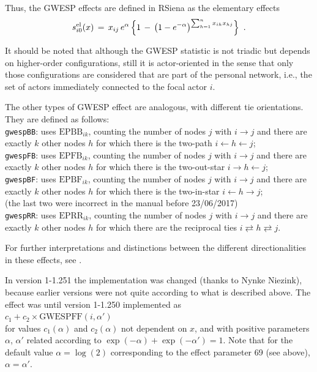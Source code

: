 \documentclass[a4paper,fleqn,11pt]{article}
\newcommand{\+}{\, + \,}
\newcommand{\RS}{{\sf \textsf{RSiena} }}
\newcommand{\vit}{\theenumi}
\begin{document}
\begin{enumerate}
Thus, the GWESP effects are defined in \RS as the elementary effects
\begin{equation}
 s^{\rm el}_{i\vit}(x) \,=\,
       x_{ij} \,
                        e^{\alpha} \,\Big\{1 \,-\, \big(1 -
                        e^{-\alpha}\big)^{\sum_{h=1}^n x_{ih}x_{hj} }  \Big\}
      \,   \ .
         \label{GWESP3}
\end{equation}

It should be noted that although the GWESP statistic is not triadic but
depends on higher-order configurations, still it is actor-oriented
in the sense that only those configurations are considered that are part of the
personal network, i.e., the set of actors immediately connected
to the focal actor $i$.

The other types of GWESP effect are analogous, with
different tie orientations. They are defined as follows:\\
\texttt{gwespBB}: uses $\text{EPBB}_{ik}$, counting the number of nodes $j$
with $i \rightarrow j$ and there are exactly $k$ other
nodes $h$ for which there is the two-path $i \leftarrow h \leftarrow j$;\\
\texttt{gwespFB}: uses $\text{EPFB}_{ik}$, counting the number of nodes $j$
with $i \rightarrow j$ and there are exactly $k$ other
nodes $h$ for which there is the two-out-star $i \rightarrow h \leftarrow j$;\\
\texttt{gwespBF}: uses $\text{EPBF}_{ik}$, counting the number of nodes $j$
with $i \rightarrow j$ and there are exactly $k$ other
nodes $h$ for which there is the two-in-star $i \leftarrow h \rightarrow j$;\\
(the last two were incorrect in the manual before 23/06/2017)\\
\texttt{gwespRR}: uses $\text{EPRR}_{ik}$, counting the number of nodes $j$
with $i \rightarrow j$ and there are exactly $k$ other
nodes $h$ for which there are the reciprocal ties $i \rightleftarrows h \rightleftarrows j$.

For further interpretations and distinctions between the different directionalities
in these effects, see \citet{RPW2009}.

In version 1-1.251 the implementation was changed (thanks to Nynke Niezink),
because earlier versions were not quite according to what is described above.
The effect was until version 1-1.250 implemented as\\
$c_1 + c_2 \times \text{GWESPFF}(i, \alpha')$\\
for values $c_1(\alpha)$ and $c_2(\alpha)$ not dependent on $x$, and with
positive parameters $\alpha$, $\alpha'$ related according to
$\exp(-\alpha) + \exp(-\alpha') = 1$. Note that for the default value
$\alpha = \log(2)$ corresponding to the effect parameter 69 (see above), $\alpha = \alpha'$.


\end{enumerate}
\end{document}
